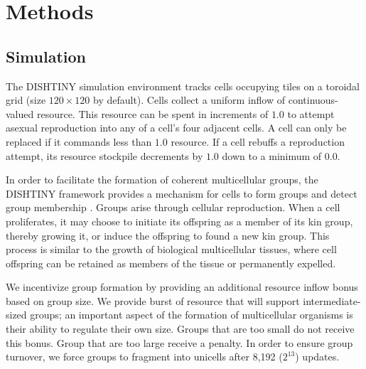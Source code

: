 \section{Methods} \label{sec:methods;ch:measuring-cna}

\subsection{Simulation}




The DISHTINY simulation environment tracks cells occupying tiles on a toroidal grid (size $120\times120$ by default).
Cells collect a uniform inflow of continuous-valued resource.
This resource can be spent in increments of $1.0$ to attempt asexual reproduction into any of a cell's four adjacent cells.
A cell can only be replaced if it commands less than $1.0$ resource.
If a cell rebuffs a reproduction attempt, its resource stockpile decrements by $1.0$ down to a minimum of $0.0$.

In order to facilitate the formation of coherent multicellular groups, the DISHTINY framework provides a mechanism for cells to form groups and detect group membership \citep{moreno2019toward}.
Groups arise through cellular reproduction.
When a cell proliferates, it may choose to initiate its offspring as a member of its kin group, thereby growing it, or induce the offspring to found a new kin group.
This process is similar to the growth of biological multicellular tissues, where cell offspring can be retained as members of the tissue or permanently expelled.

We incentivize group formation by providing an additional resource inflow bonus based on group size.
We provide burst of resource that will support intermediate-sized groups; an important aspect of the formation of multicellular organisms is their ability to regulate their own size.
Groups that are too small do not receive this bonus.
Group that are too large receive a penalty.
In order to ensure group turnover, we force groups to fragment into unicells after 8,192 ($2^{13}$) updates.


